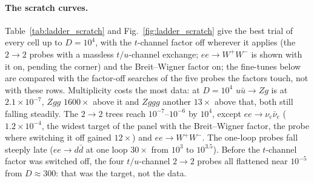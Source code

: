 \documentclass[11pt]{article}
\begin{document}
\paragraph{The scratch curves.} Table~\ref{tab:ladder_scratch} and Fig.~\ref{fig:ladder_scratch}
give the best trial of every cell up to $D=10^4$, with the $t$-channel factor off wherever it
applies (the $2\to2$ probes with a massless $t/u$-channel exchange; $ee\to W^+W^-$ is shown with
it on, pending the corner) and the Breit--Wigner factor on; the fine-tunes below are compared with the
factor-off searches of the five probes the factors touch, not with these rows. Multiplicity costs the most data: at
$D=10^4$ $u\bar u\to Zg$ is at $2.1\times10^{-7}$, $Zgg$ $1600\times$ above it and $Zggg$ another
$13\times$ above that, both still falling steadily. The $2\to2$ trees reach
$10^{-7}$--$10^{-6}$ by $10^4$, except $ee\to\nu_e\bar\nu_e$ ($1.2\times10^{-4}$, the widest
target of the panel with the Breit--Wigner factor, the probe where switching it off gained
$12\times$) and $ee\to W^+W^-$. The one-loop probes fall steeply late ($ee\to d\bar d$ at one loop
$30\times$ from $10^3$ to $10^{3.5}$). Before the $t$-channel factor was switched off, the four
$t/u$-channel $2\to2$ probes all flattened near $10^{-5}$ from $D\approx300$: that was the target,
not the data.
\end{document}
